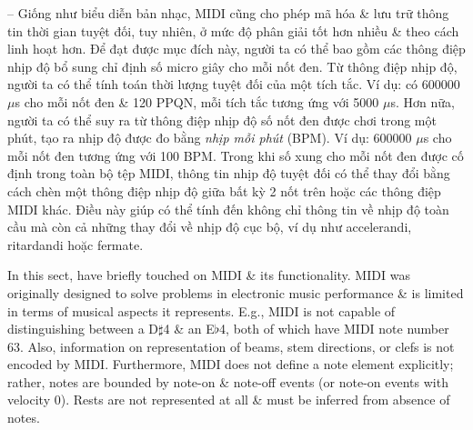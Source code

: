 \documentclass{article}
\begin{document}
\begin{itemize}
\begin{itemize}
\begin{itemize}
			-- Giống như biểu diễn bản nhạc, MIDI cũng cho phép mã hóa \& lưu trữ thông tin thời gian tuyệt đối, tuy nhiên, ở mức độ phân giải tốt hơn nhiều \& theo cách linh hoạt hơn. Để đạt được mục đích này, người ta có thể bao gồm các thông điệp nhịp độ bổ sung chỉ định số micro giây cho mỗi nốt đen. Từ thông điệp nhịp độ, người ta có thể tính toán thời lượng tuyệt đối của một tích tắc. Ví dụ: có 600000 $\mu$s cho mỗi nốt đen \& 120 PPQN, mỗi tích tắc tương ứng với 5000 $\mu$s. Hơn nữa, người ta có thể suy ra từ thông điệp nhịp độ số nốt đen được chơi trong một phút, tạo ra nhịp độ được đo bằng {\it nhịp mỗi phút} (BPM). Ví dụ: 600000 $\mu$s cho mỗi nốt đen tương ứng với 100 BPM. Trong khi số xung cho mỗi nốt đen được cố định trong toàn bộ tệp MIDI, thông tin nhịp độ tuyệt đối có thể thay đổi bằng cách chèn một thông điệp nhịp độ giữa bất kỳ 2 nốt trên hoặc các thông điệp MIDI khác. Điều này giúp có thể tính đến không chỉ thông tin về nhịp độ toàn cầu mà còn cả những thay đổi về nhịp độ cục bộ, ví dụ như accelerandi, ritardandi hoặc fermate.
						
			In this sect, have briefly touched on MIDI \& its functionality. MIDI was originally designed to solve problems in electronic music performance \& is limited in terms of musical aspects it represents. E.g., MIDI is not capable of distinguishing between a D$\sharp$4 \& an E$\flat$4, both of which have MIDI note number 63. Also, information on representation of beams, stem directions, or clefs is not encoded by MIDI. Furthermore, MIDI does not define a note element explicitly; rather, notes are bounded by note-on \& note-off events (or note-on events with velocity 0). Rests are not represented at all \& must be inferred from absence of notes.
			

\end{itemize}
\end{itemize}
\end{itemize}
\end{document}
